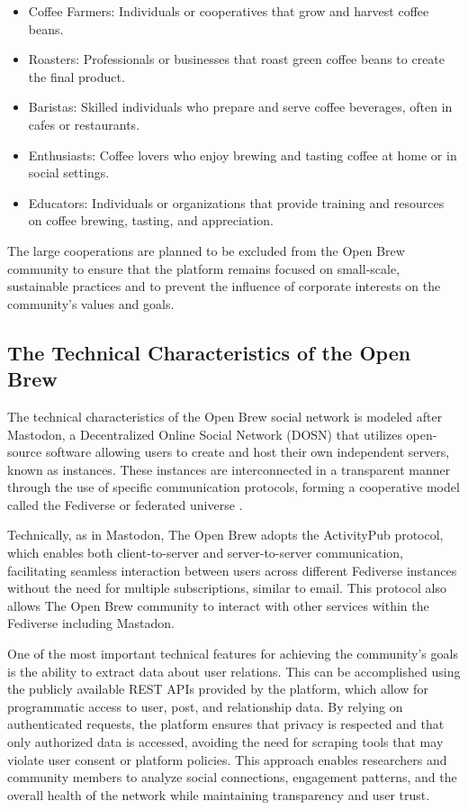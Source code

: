 \documentclass[12pt]{article}
\begin{document}
\begin{itemize}
    \item Coffee Farmers: Individuals or cooperatives that grow and harvest coffee beans.
    \item Roasters: Professionals or businesses that roast green coffee beans to create the final product.
    \item Baristas: Skilled individuals who prepare and serve coffee beverages, often in cafes or restaurants.
    \item Enthusiasts: Coffee lovers who enjoy brewing and tasting coffee at home or in social settings.
    \item Educators: Individuals or organizations that provide training and resources on coffee brewing, tasting, and appreciation.
\end{itemize}

The large cooperations are planned to be excluded from the Open Brew community to ensure that the platform remains focused on small-scale, sustainable practices and to prevent the influence of corporate interests on the community's values and goals.

\subsection{The Technical Characteristics of the Open Brew}
\label{subsection:technical_characteristics_of_the_open_brew}
The technical characteristics of the Open Brew social network is modeled after Mastodon, a Decentralized Online Social Network (DOSN) that utilizes open-source software allowing users to create and host their own independent servers, known as instances. These instances are interconnected in a transparent manner through the use of specific communication protocols, forming a cooperative model called the Fediverse or federated universe \cite{la2022information}.

Technically, as in Mastodon, The Open Brew adopts the ActivityPub protocol, which enables both client-to-server and server-to-server communication, facilitating seamless interaction between users across different Fediverse instances without the need for multiple subscriptions, similar to email. This protocol also allows The Open Brew community to interact with other services within the Fediverse including Mastadon.

One of the most important technical features for achieving the community's goals is the ability to extract data about user relations. This can be accomplished using the publicly available REST APIs provided by the platform, which allow for programmatic access to user, post, and relationship data. By relying on authenticated requests, the platform ensures that privacy is respected and that only authorized data is accessed, avoiding the need for scraping tools that may violate user consent or platform policies. This approach enables researchers and community members to analyze social connections, engagement patterns, and the overall health of the network while maintaining transparency and user trust.
\end{document}
